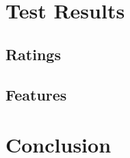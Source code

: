 \documentclass[conference]{IEEEtran}
\begin{document}
\section{Test Results}
\subsection{Ratings}


\subsection{Features}




\section{Conclusion}







\end{document}
